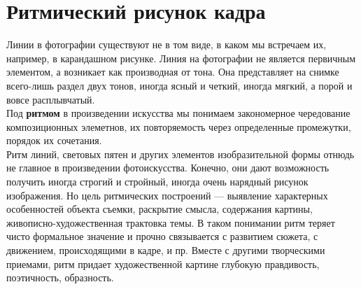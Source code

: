 \documentclass{article}
\begin{document}
\section{Ритмический рисунок кадра}
Линии в фотографии существуют не в том виде, в каком мы встречаем их, например, в карандашном рисунке. Линия на фотографии не является первичным элементом, а возникает как производная от тона. Она представляет на снимке всего-лишь раздел двух тонов, иногда ясный и четкий, иногда мягкий, а порой и вовсе расплывчатый.
\\
Под \textbf{ритмом} в произведении искусства мы понимаем закономерное чередование композиционных элеметнов, их повторяемость через определенные промежутки, порядок их сочетания.
\\
Ритм линий, световых пятен и других элементов изобразительной формы отнюдь не главное в произведении фотоискусства. Конечно, они дают возможность получить иногда строгий и стройный, иногда очень нарядный рисунок изображения. Но цель ритмических построений --- выявление характерных особенностей объекта съемки, раскрытие смысла, содержания картины, живописно-художественная трактовка темы. В таком понимании ритм теряет чисто формальное значение и прочно связывается с развитием сюжета, с движением, происходящими в кадре, и пр. Вместе с другими творческими приемами, ритм придает художественной картине глубокую правдивость, поэтичность, образность.
\end{document}
